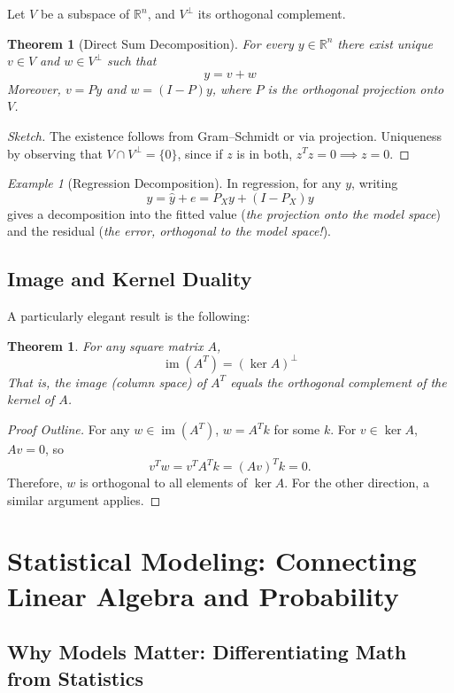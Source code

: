 \documentclass[11pt,a4paper]{article}
\theoremstyle{definition}
\theoremstyle{plain}
\newtheorem{theorem}[definition]{Theorem}
\theoremstyle{remark}
\newtheorem{example}[definition]{Example}
\begin{document}
Let $V$ be a subspace of $\mathbb{R}^n$, and $V^{\perp}$ its orthogonal complement.

\begin{theorem}[Direct Sum Decomposition]
\label{thm:directsum}
For every $y \in \mathbb{R}^n$ there exist unique $v \in V$ and $w \in V^\perp$ such that
\[
y = v + w
\]
Moreover, $v = P y$ and $w = (I - P) y$, where $P$ is the orthogonal projection onto $V$.
\end{theorem}

\begin{proof}[Sketch]
The existence follows from Gram–Schmidt or via projection. Uniqueness by observing that $V \cap V^\perp = \{ 0 \}$, since if $z$ is in both, $z^T z = 0 \implies z=0$.
\end{proof}

\begin{example}[Regression Decomposition]
In regression, for any $y$, writing
\[
y = \hat{y} + e = P_X y + (I - P_X) y
\]
gives a decomposition into the fitted value (\emph{the projection onto the model space}) and the residual (\emph{the error, orthogonal to the model space!}).
\end{example}

\subsection{Image and Kernel Duality}

A particularly elegant result is the following:

\begin{theorem}
For any square matrix $A$,
\[
\operatorname{im}(A^T) = (\ker A)^\perp
\]
That is, the image (column space) of $A^T$ equals the orthogonal complement of the kernel of $A$.
\end{theorem}
\begin{proof}[Proof Outline]
For any $w \in \operatorname{im}(A^T)$, $w = A^T k$ for some $k$. For $v \in \ker A$, $A v = 0$, so
\[
v^T w = v^T A^T k = (A v)^T k = 0.
\]
Therefore, $w$ is orthogonal to all elements of $\ker A$.
For the other direction, a similar argument applies.
\end{proof}

\section{Statistical Modeling: Connecting Linear Algebra and Probability}

\subsection{Why Models Matter: Differentiating Math from Statistics}
\end{document}

